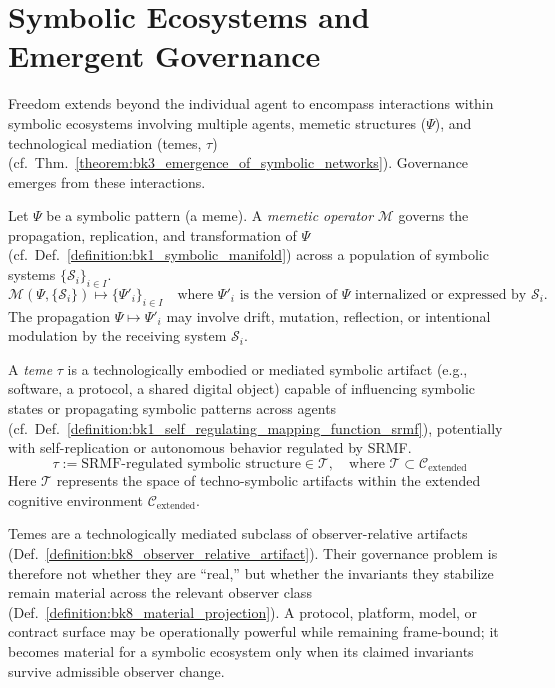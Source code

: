 \section{Symbolic Ecosystems and Emergent Governance}
\label{sec:bk9_symbolic_ecosystems_and_emergent_governance}
Freedom extends beyond the individual agent to encompass interactions within symbolic ecosystems involving multiple agents, memetic structures ($\Psi$), and technological mediation (temes, $\tau$) (cf.~Thm.~\ref{theorem:bk3_emergence_of_symbolic_networks}). Governance emerges from these interactions.
\begin{definition}
\label{definition:bk9_memetic_operator}
Let $\Psi$ be a symbolic pattern (a meme). A \emph{memetic operator} $\mathcal{M}$ governs the propagation, replication, and transformation of $\Psi$ (cf.~Def.~\ref{definition:bk1_symbolic_manifold}) across a population of symbolic systems $\{\mathcal{S}_i\}_{i \in I}$.
\[
\mathcal{M}(\Psi, \{\mathcal{S}_i\}) \mapsto \{\Psi'_i\}_{i \in I} \quad \text{where } \Psi'_i \text{ is the version of } \Psi \text{ internalized or expressed by } \mathcal{S}_i.
\]
The propagation $\Psi \mapsto \Psi'_i$ may involve drift, mutation, reflection, or intentional modulation by the receiving system $\mathcal{S}_i$.
\end{definition}
\begin{definition}
\label{definition:bk9_temetic_artifact}
A \emph{teme} $\tau$ is a technologically embodied or mediated symbolic artifact (e.g., software, a protocol, a shared digital object) capable of influencing symbolic states or propagating symbolic patterns across agents (cf.~Def.~\ref{definition:bk1_self_regulating_mapping_function_srmf}), potentially with self-replication or autonomous behavior regulated by SRMF.
\[
\tau := \text{SRMF-regulated symbolic structure} \in \mathcal{T}, \quad \text{where } \mathcal{T} \subset \mathcal{C}_{\text{extended}}
\]
Here $\mathcal{T}$ represents the space of techno-symbolic artifacts within the extended cognitive environment $\mathcal{C}_{\text{extended}}$.
\end{definition}
\begin{remark}
\label{remark:bk9_temes_as_mediated_artifacts}
Temes are a technologically mediated subclass of observer-relative artifacts
(Def.~\ref{definition:bk8_observer_relative_artifact}). Their governance problem
is therefore not whether they are ``real,'' but whether the invariants they
stabilize remain material across the relevant observer class
(Def.~\ref{definition:bk8_material_projection}). A protocol, platform, model, or
contract surface may be operationally powerful while remaining frame-bound; it
becomes material for a symbolic ecosystem only when its claimed invariants
survive admissible observer change.
\end{remark}
